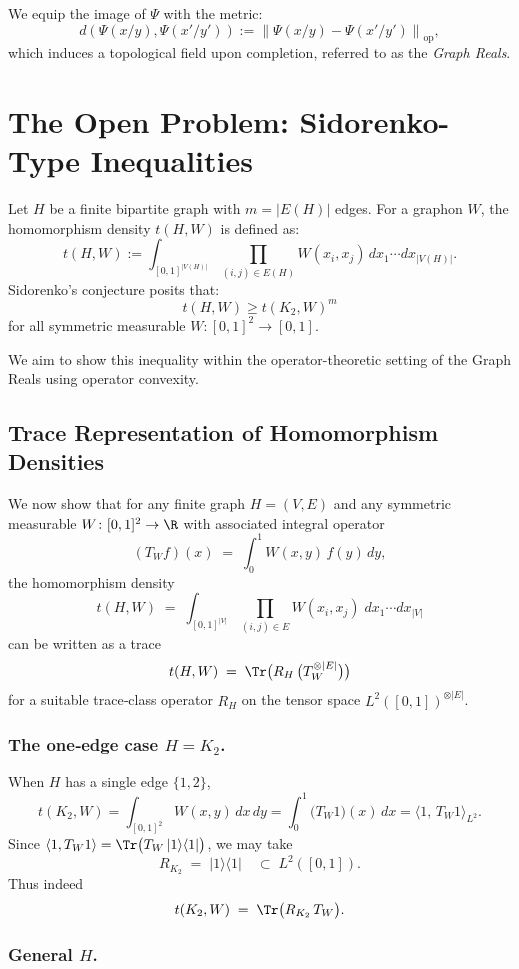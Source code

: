 \documentclass[11pt]{article}
\theoremstyle{definition}
\theoremstyle{plain}
\theoremstyle{remark}
\begin{document}
We equip the image of $\Psi$ with the metric:
\[
d(\Psi(x/y), \Psi(x'/y')) := \left\| \Psi(x/y) - \Psi(x'/y') \right\|_{\text{op}},
\]
which induces a topological field upon completion, referred to as the \emph{Graph Reals}.

\section{The Open Problem: Sidorenko-Type Inequalities}

Let $H$ be a finite bipartite graph with $m = |E(H)|$ edges. For a graphon $W$, the homomorphism density $t(H, W)$ is defined as:
\[
t(H, W) := \int_{[0,1]^{|V(H)|}} \prod_{(i,j) \in E(H)} W(x_i, x_j)\,dx_1\cdots dx_{|V(H)|}.
\]
Sidorenko's conjecture posits that:
\[
t(H, W) \geq t(K_2, W)^m
\]
for all symmetric measurable $W: [0,1]^2 \to [0,1]$.

We aim to show this inequality within the operator-theoretic setting of the Graph Reals using operator convexity.

\subsection{Trace Representation of Homomorphism Densities}

We now show that for any finite graph \(H=(V,E)\) and any symmetric measurable \(W\colon[0,1]^2\to\R\) with associated integral operator 
\[
(T_W f)(x)\;=\;\int_0^1 W(x,y)\,f(y)\,dy,
\]
the homomorphism density
\[
t(H,W)
\;=\;
\int_{[0,1]^{|V|}}
\prod_{(i,j)\in E}W(x_i,x_j)\;
dx_1\cdots dx_{|V|}
\]
can be written as a trace
\[
t(H,W)
\;=\;
\Tr\bigl(R_H\,\bigl(T_W^{\otimes |E|}\bigr)\bigr)
\]
for a suitable trace‐class operator \(R_H\) on the tensor space \(L^2([0,1])^{\otimes |E|}\).

\subsubsection*{The one‐edge case \(H=K_2\).}

When \(H\) has a single edge \(\{1,2\}\), 
\[
t(K_2,W)
=\int_{[0,1]^2}W(x,y)\,dx\,dy
=\int_0^1\bigl(T_W1\bigr)(x)\,dx
=\langle1,\,T_W1\rangle_{L^2}.
\]
Since \(\langle1,T_W1\rangle=\Tr\bigl(T_W\,|1\rangle\langle1|\bigr)\), we may take
\[
R_{K_2}\;=\;|1\rangle\langle1|\quad\subset\;L^2([0,1]).
\]
Thus indeed
\[
t(K_2,W)\;=\;\Tr\bigl(R_{K_2}\,T_W\bigr).
\]

\subsubsection*{General \(H\).}
\end{document}
